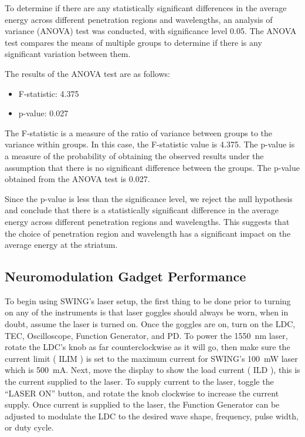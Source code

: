 \documentclass[journal,twoside,web]{ieeecolor}
\begin{document}
To determine if there are any statistically significant differences in the average energy across different penetration regions and wavelengths, an analysis of 
variance (ANOVA) test was conducted, with significance level 0.05. The ANOVA test compares the means of multiple groups to determine if there is any significant 
variation between them.

The results of the ANOVA test are as follows:

\begin{itemize}
    \item F-statistic: 4.375
    \item p-value: 0.027
\end{itemize}

The F-statistic is a measure of the ratio of variance between groups to the variance within groups. In this case, the F-statistic value is 4.375. The p-value is a 
measure of the probability of obtaining the observed results under the assumption that there is no significant difference between the groups. The p-value obtained 
from the ANOVA test is 0.027.

Since the p-value is less than the significance level, we reject the null hypothesis and conclude that there is a statistically significant difference in the average 
energy across different penetration regions and wavelengths. This suggests that the choice of penetration region and wavelength has a significant impact on the average 
energy at the striatum.

\subsection{Neuromodulation Gadget Performance}

To begin using SWING's laser setup, the first thing to be done prior to turning on any of the instruments is that laser goggles should always be worn, when in doubt, 
assume the laser is turned on\cite{b10}. Once the goggles are on, turn on the LDC, TEC, Oscilloscope, Function Generator, and PD. To power the 1550~nm laser, rotate 
the LDC's knob as far counterclockwise as it will go, then make sure the current limit (
ILIM 
) is set to the maximum current for SWING's \SI{100}{\milli\watt} laser which is \SI{500}{\milli\ampere}. Next, move the display to show the load current (
ILD 
), this is the current supplied to the laser. To supply current to the laser, toggle the “LASER ON” button, and rotate the knob clockwise to increase the 
current supply. Once current is supplied to the laser, the Function Generator can be adjusted to modulate the LDC to the desired wave shape, frequency, pulse 
width, or duty cycle. 
\end{document}
